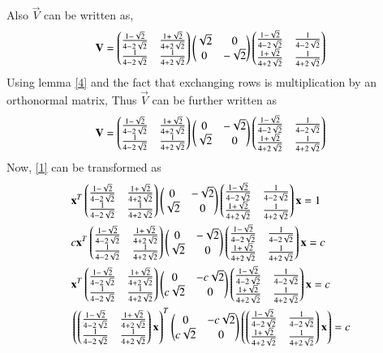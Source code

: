 \documentclass[journal,12pt,twocolumn]{IEEEtran}
\begin{document}
Also $\vec{V}$ can be written as,
\begin{align}
	\mathbf{V} = \begin{pmatrix}\frac{1-\sqrt{2}}{4-2\sqrt{2}} & \frac{1+\sqrt{2}}{4+2\sqrt{2}} \\ \frac{1}{4-2\sqrt{2}} & \frac{1}{4+2\sqrt{2}}\end{pmatrix} \begin{pmatrix}\sqrt{2} &0 \\ 0 & -\sqrt{2}\end{pmatrix} \begin{pmatrix}\frac{1-\sqrt{2}}{4-2\sqrt{2}} & \frac{1}{4-2\sqrt{2}}  \\ \frac{1+\sqrt{2}}{4+2\sqrt{2}} & \frac{1}{4+2\sqrt{2}}\end{pmatrix}
\end{align}
Using lemma \eqref{4} and the fact that exchanging rows is multiplication by an orthonormal matrix, Thus $\vec{V}$ can be further written as 
\begin{align}
	\mathbf{V} = \begin{pmatrix}\frac{1-\sqrt{2}}{4-2\sqrt{2}} & \frac{1+\sqrt{2}}{4+2\sqrt{2}} \\ \frac{1}{4-2\sqrt{2}} & \frac{1}{4+2\sqrt{2}}\end{pmatrix} \begin{pmatrix} 0 & -\sqrt{2}\\ \sqrt{2} & 0\end{pmatrix} \begin{pmatrix}\frac{1-\sqrt{2}}{4-2\sqrt{2}} & \frac{1}{4-2\sqrt{2}}  \\ \frac{1+\sqrt{2}}{4+2\sqrt{2}} & \frac{1}{4+2\sqrt{2}}\end{pmatrix}	
\end{align} 
Now, \eqref{1} can be transformed as
\begin{align}
& \mathbf{x}^T\begin{pmatrix}\frac{1-\sqrt{2}}{4-2\sqrt{2}} & \frac{1+\sqrt{2}}{4+2\sqrt{2}} \\ \frac{1}{4-2\sqrt{2}} & \frac{1}{4+2\sqrt{2}}\end{pmatrix} \begin{pmatrix}0 &-\sqrt{2}\\ \sqrt{2} & 0\end{pmatrix} \begin{pmatrix}\frac{1-\sqrt{2}}{4-2\sqrt{2}} & \frac{1}{4-2\sqrt{2}}  \\ \frac{1+\sqrt{2}}{4+2\sqrt{2}} & \frac{1}{4+2\sqrt{2}}\end{pmatrix}\mathbf{x} = 1 \\
& c\mathbf{x}^T\begin{pmatrix}\frac{1-\sqrt{2}}{4-2\sqrt{2}} & \frac{1+\sqrt{2}}{4+2\sqrt{2}} \\ \frac{1}{4-2\sqrt{2}} & \frac{1}{4+2\sqrt{2}}\end{pmatrix} \begin{pmatrix}0 & -\sqrt{2}\\ \sqrt{2} & 0\end{pmatrix} \begin{pmatrix}\frac{1-\sqrt{2}}{4-2\sqrt{2}} & \frac{1}{4-2\sqrt{2}}  \\ \frac{1+\sqrt{2}}{4+2\sqrt{2}} & \frac{1}{4+2\sqrt{2}}\end{pmatrix}\mathbf{x} = c \\
& \mathbf{x}^T\begin{pmatrix}\frac{1-\sqrt{2}}{4-2\sqrt{2}} & \frac{1+\sqrt{2}}{4+2\sqrt{2}} \\ \frac{1}{4-2\sqrt{2}} & \frac{1}{4+2\sqrt{2}}\end{pmatrix} \begin{pmatrix}0 & -c\sqrt{2}\\ c\sqrt{2} & 0\end{pmatrix} \begin{pmatrix}\frac{1-\sqrt{2}}{4-2\sqrt{2}} & \frac{1}{4-2\sqrt{2}}  \\ \frac{1+\sqrt{2}}{4+2\sqrt{2}} & \frac{1}{4+2\sqrt{2}}\end{pmatrix}\mathbf{x} = c \\
& \left(\begin{pmatrix}\frac{1-\sqrt{2}}{4-2\sqrt{2}} & \frac{1+\sqrt{2}}{4+2\sqrt{2}} \\ \frac{1}{4-2\sqrt{2}} & \frac{1}{4+2\sqrt{2}}\end{pmatrix}\mathbf{x}\right)^T\begin{pmatrix}0 & -c\sqrt{2}\\ c\sqrt{2} & 0\end{pmatrix}\left(\begin{pmatrix}\frac{1-\sqrt{2}}{4-2\sqrt{2}} & \frac{1}{4-2\sqrt{2}}  \\ \frac{1+\sqrt{2}}{4+2\sqrt{2}} & \frac{1}{4+2\sqrt{2}}\end{pmatrix}\mathbf{x}\right) = c \label{5}
\end{align} 
\end{document}
